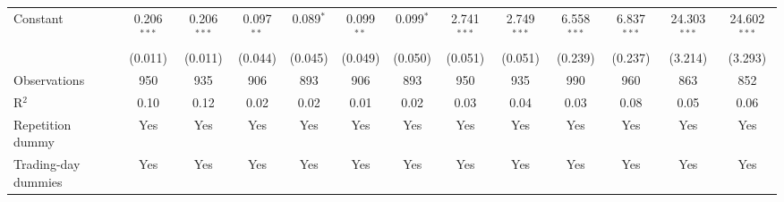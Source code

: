 \begin{tabular}{lcccccccccccc}
   Constant            & 0.206$^{***}$ & 0.206$^{***}$ & 0.097$^{**}$ & 0.089$^{*}$   & 0.099$^{**}$ & 0.099$^{*}$  & 2.741$^{***}$ & 2.749$^{***}$  & 6.558$^{***}$ & 6.837$^{***}$  & 24.303$^{***}$ & 24.602$^{***}$\\   
                       & (0.011)       & (0.011)       & (0.044)      & (0.045)       & (0.049)      & (0.050)      & (0.051)       & (0.051)        & (0.239)       & (0.237)        & (3.214)        & (3.293)\\   
   \midrule
   Observations        & 950           & 935           & 906          & 893           & 906          & 893          & 950           & 935            & 990           & 960            & 863            & 852\\  
   R$^2$               & 0.10          & 0.12          & 0.02         & 0.02          & 0.01         & 0.02         & 0.03          & 0.04           & 0.03          & 0.08           & 0.05           & 0.06\\  
   Repetition dummy    & Yes           & Yes           & Yes          & Yes           & Yes          & Yes          & Yes           & Yes            & Yes           & Yes            & Yes            & Yes\\  
   Trading-day dummies & Yes           & Yes           & Yes          & Yes           & Yes          & Yes          & Yes           & Yes            & Yes           & Yes            & Yes            & Yes\\  
   \midrule \midrule
\end{tabular}
